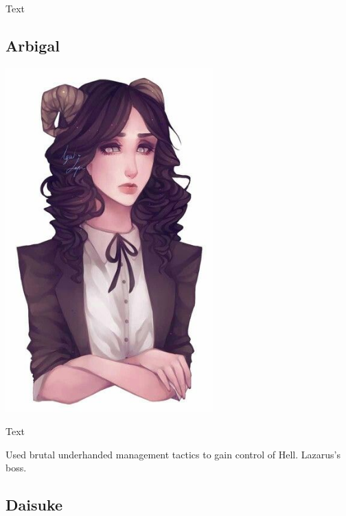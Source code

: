 \noindent 

Text

\smallskip

\subsection*{Arbigal} 

\begin{center}
\includegraphics[width=80mm]{./content/img/arbigail.jpg}
\begin{figure}[h]
\end{figure}
\end{center}

\noindent 

Text

Used brutal underhanded management tactics to gain control of Hell.  Lazarus's boss. 

\smallskip

\subsection*{Daisuke } 

